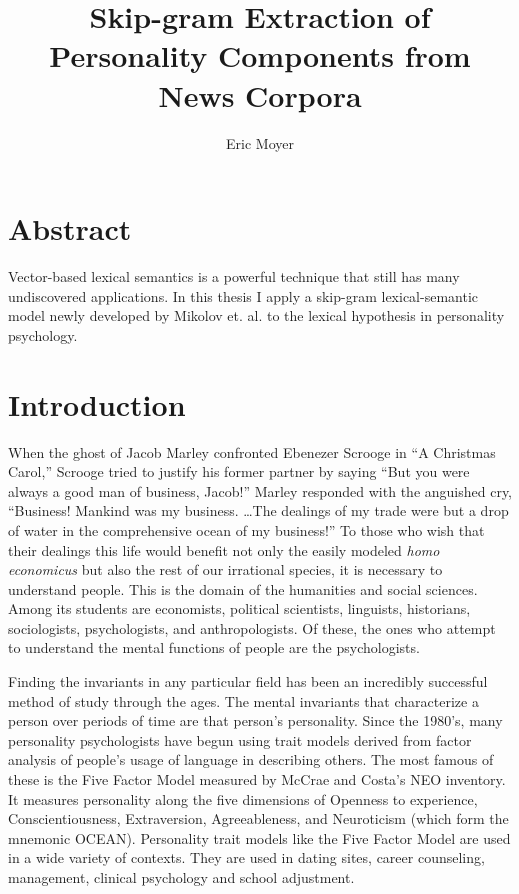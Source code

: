 \documentclass[10pt,letterpaper]{book}
\author{Eric Moyer}
\title{Skip-gram Extraction of Personality Components from News Corpora}
\begin{document}
\frontmatter
\maketitle

\chapter{Abstract}
Vector-based lexical semantics is a powerful technique that still has many undiscovered applications. In this thesis I apply a skip-gram lexical-semantic model newly developed by Mikolov et. al. to the lexical hypothesis in personality psychology.

\mainmatter
\chapter{Introduction}

When the ghost of Jacob Marley confronted Ebenezer Scrooge in ``A Christmas Carol,'' Scrooge tried to justify his former partner by saying ``But you were always a good man of business, Jacob!'' Marley responded with the anguished cry, ``Business! Mankind was my business. \ldots The dealings of my trade were but a drop of water in the comprehensive ocean of my business!'' To those who wish that their dealings this life would benefit not only the easily modeled \textit{homo economicus} but also the rest of our irrational species, it is necessary to understand people. This is the domain of the humanities and social sciences. Among its students are economists, political scientists, linguists, historians, sociologists, psychologists, and anthropologists. Of these, the ones who attempt to understand the mental functions of people are the psychologists.

Finding the invariants in any particular field has been an incredibly successful method of study through the ages. The mental invariants that characterize a person over periods of time are that person's personality. Since the 1980's, many personality psychologists have begun using trait models derived from factor analysis of people's usage of language in describing others. The most famous of these is the Five Factor Model measured by McCrae and Costa's NEO inventory. It measures personality along the five dimensions of Openness to experience, Conscientiousness, Extraversion, Agreeableness, and Neuroticism (which form the mnemonic OCEAN). Personality trait models like the Five Factor Model are used in a wide variety of contexts. They are used in dating sites, career counseling, management, clinical psychology and school adjustment.
\end{document}
